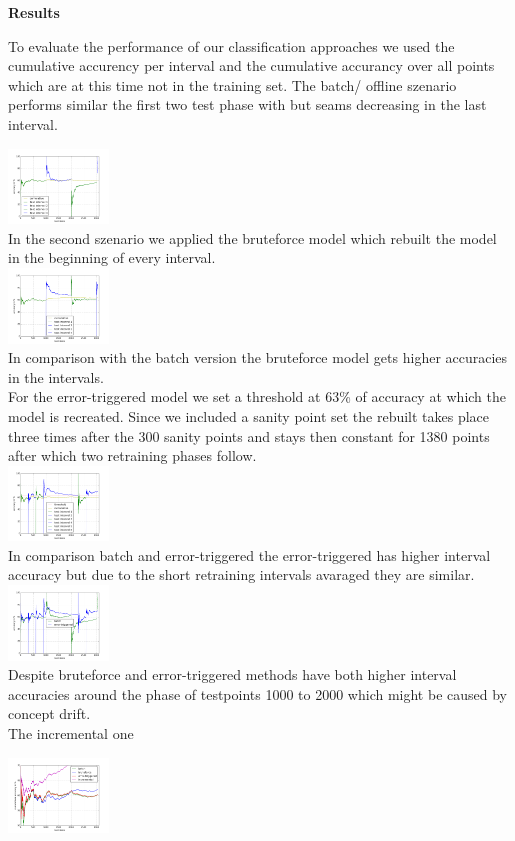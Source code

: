 \begin{center} \textbf{\huge Results} \end{center}
To evaluate the performance of our classification approaches we used the cumulative accurency per interval and the cumulative accurancy over all points which are at this time not in the training set. The batch/ offline szenario performs similar the first two test phase with but seams decreasing in the last interval.

 \includegraphics[width=0.2\textwidth]{./plots/batchPlot.png}\\

In the second szenario we applied the bruteforce model which rebuilt the model in the beginning of every interval.\\
   \includegraphics[width=0.2\textwidth]{./plots/bruteforce2_Plot.png}\\
In comparison with the batch version the bruteforce model gets higher accuracies in the intervals.\\

For the error-triggered model we set a threshold at 63\% of accuracy at which the model is recreated. Since we included a sanity point set the rebuilt takes place three times after the 300 sanity points and stays then constant for 1380 points after which two retraining phases follow.\\
   \includegraphics[width=0.2\textwidth]{./plots/errorTriggeredPlot}\\
In comparison batch and error-triggered the error-triggered has higher interval accuracy but due to the short retraining intervals avaraged they are similar. \\

\includegraphics[width=0.2\textwidth]{./plots/errortriggered_batch}\\
Despite bruteforce and error-triggered methods have both higher interval accuracies around the phase of testpoints 1000 to 2000 which might be caused by concept drift. 
\\

The incremental one 

   \includegraphics[width=0.2\textwidth]{./plots/allAccuracies}\\

